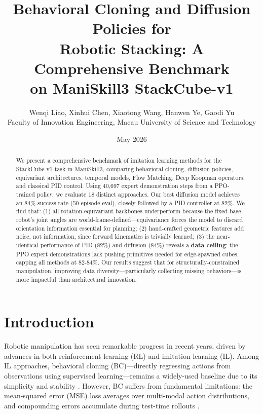 \documentclass[twocolumn]{article}
\title{Behavioral Cloning and Diffusion Policies for\\Robotic Stacking: A Comprehensive Benchmark \\ on ManiSkill3 StackCube-v1}
\author{Wenqi Liao, Xinhui Chen, Xiaotong Wang, Hanwen Ye, Gaodi Yu \\
       Faculty of Innovation Engineering, Macau University of Science and Technology}
\date{May 2026}
\begin{document}
\maketitle

\begin{abstract}
We present a comprehensive benchmark of imitation learning methods for the StackCube-v1 task in ManiSkill3, comparing behavioral cloning, diffusion policies, equivariant architectures, temporal models, Flow Matching, Deep Koopman operators, and classical PID control. Using 40,697 expert demonstration steps from a PPO-trained policy, we evaluate 18 distinct approaches. Our best diffusion model achieves an 84\% success rate (50-episode eval), closely followed by a PID controller at 82\%. We find that: (1) all rotation-equivariant backbones underperform because the fixed-base robot's joint angles are world-frame-defined---equivariance forces the model to discard orientation information essential for planning; (2) hand-crafted geometric features add noise, not information, since forward kinematics is trivially learned; (3) the near-identical performance of PID (82\%) and diffusion (84\%) reveals a \textbf{data ceiling}: the PPO expert demonstrations lack pushing primitives needed for edge-spawned cubes, capping all methods at 82-84\%. Our results suggest that for structurally-constrained manipulation, improving data diversity---particularly collecting missing behaviors---is more impactful than architectural innovation.
\end{abstract}

\section{Introduction}

Robotic manipulation has seen remarkable progress in recent years, driven by advances in both reinforcement learning (RL) and imitation learning (IL). Among IL approaches, behavioral cloning (BC)---directly regressing actions from observations using supervised learning---remains a widely-used baseline due to its simplicity and stability \cite{pomerleau1991efficient}. However, BC suffers from fundamental limitations: the mean-squared error (MSE) loss averages over multi-modal action distributions, and compounding errors accumulate during test-time rollouts \cite{ross2011reduction}.
\end{document}
